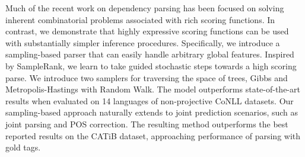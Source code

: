 Much of the recent work on dependency parsing has been focused on solving inherent combinatorial problems associated with rich scoring functions. In contrast, we demonstrate that highly expressive scoring functions can be used with substantially simpler inference procedures. Specifically, we introduce a sampling-based parser that can easily handle arbitrary global features. Inspired by SampleRank, we learn to take guided stochastic steps towards a high scoring parse. We introduce two samplers for traversing the space of trees, Gibbs and Metropolis-Hastings with Random Walk. The model outperforms state-of-the-art results when evaluated on 14 languages of non-projective CoNLL datasets. Our sampling-based approach naturally extends to joint prediction scenarios, such as joint parsing and POS correction. The resulting method outperforms the best reported results on the CATiB dataset, approaching performance of parsing with gold tags.
